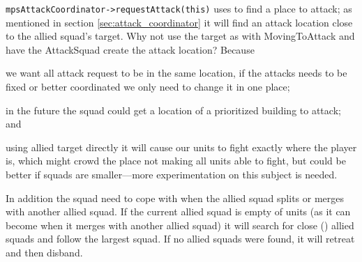 \texttt{mpsAttackCoordinator->requestAttack(this)} uses  to find a place to attack; as mentioned in section \ref{sec:attack_coordinator} it will find an attack location close to the allied squad's target. Why not use the target as with MovingToAttack and have the AttackSquad create the attack location? Because
\begin{inparaenum}[1\upshape)]
	\item we want all attack request to be in the same location, if the attacks needs to be fixed or better coordinated we only need to change it in one place;
	\item in the future the squad could get a location of a prioritized building to attack; and
	\item using allied target directly it will cause our units to fight exactly where the player is, which might crowd the place not making all units able to fight, but could be better if squads are smaller—more experimentation on this subject is needed.
\end{inparaenum}

In addition the squad need to cope with when the allied squad splits or merges with another allied squad. If the current allied squad is empty of units (as it can become when it merges with another allied squad) it will search for close (\squadAttackFindAlliedSquadDistance) allied squads and follow the largest squad. If no allied squads were found, it will retreat and then disband.

